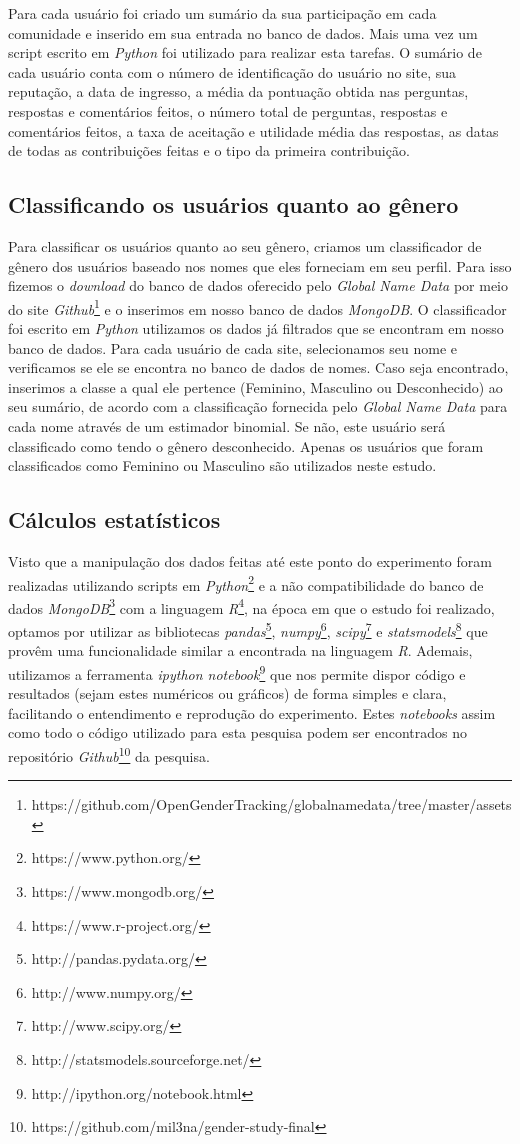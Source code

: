 Para cada usuário foi criado um sumário da sua participação em cada comunidade e inserido em sua entrada no banco de dados. Mais uma vez um script escrito em \emph{Python} foi utilizado para realizar esta tarefas. O sumário de cada usuário conta com o número de identificação do usuário no site, sua reputação, a data de ingresso, a média da pontuação obtida nas perguntas, respostas e comentários feitos, o número total de perguntas, respostas e comentários feitos, a taxa de aceitação e utilidade média das respostas, as datas de todas as contribuições feitas e o tipo da primeira contribuição.

\subsection{Classificando os usuários quanto ao gênero}

Para classificar os usuários quanto ao seu gênero, criamos um classificador de gênero dos usuários baseado nos nomes que eles forneciam em seu perfil. Para isso fizemos o \emph{download} do banco de dados oferecido pelo \emph{Global Name Data} por meio do site \emph{Github}\footnote{https://github.com/OpenGenderTracking/globalnamedata/tree/master/assets} e o inserimos em nosso banco de dados \emph{MongoDB}. O classificador foi escrito em \emph{Python} utilizamos os dados já filtrados que se encontram em nosso banco de dados. Para cada usuário de cada site, selecionamos seu nome e verificamos se ele se encontra no banco de dados de nomes. Caso seja encontrado, inserimos a classe a qual ele pertence (Feminino, Masculino ou Desconhecido) ao seu sumário, de acordo com a classificação fornecida pelo \emph{Global Name Data} para cada nome através de um estimador binomial. Se não, este usuário será classificado como tendo o gênero desconhecido. Apenas os usuários que foram classificados como Feminino ou Masculino são utilizados neste estudo.

\subsection{Cálculos estatísticos}

Visto que a manipulação dos dados feitas até este ponto do experimento foram realizadas utilizando scripts em \emph{Python}\footnote{https://www.python.org/} e a não compatibilidade do banco de dados \emph{MongoDB}\footnote{https://www.mongodb.org/} com a linguagem \emph{R}\footnote{https://www.r-project.org/}, na época em que o estudo foi realizado, optamos por utilizar as bibliotecas \emph{pandas}\footnote{http://pandas.pydata.org/}, \emph{numpy}\footnote{http://www.numpy.org/}, \emph{scipy}\footnote{http://www.scipy.org/} e \emph{statsmodels}\footnote{http://statsmodels.sourceforge.net/} que provêm uma funcionalidade similar a encontrada na linguagem \emph{R}. Ademais, utilizamos a ferramenta \emph{ipython notebook}\footnote{http://ipython.org/notebook.html} que nos permite dispor código e resultados (sejam estes numéricos ou gráficos) de forma simples e clara, facilitando o entendimento e reprodução do experimento. Estes \emph{notebooks} assim como todo o código utilizado para esta pesquisa podem ser encontrados no repositório \emph{Github}\footnote{https://github.com/mil3na/gender-study-final} da pesquisa.

